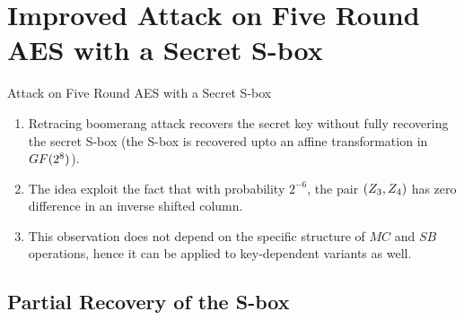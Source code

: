\documentclass[notheorems]{beamer}
\theoremstyle{definition}
\theoremstyle{example}
\begin{document}
    \section[Secret S-Boxes]{Improved Attack on Five Round AES with a Secret S-box}
    \label{sec:secret-s-box}

    \begin{frame}[<+->]{Attack on Five Round AES with a Secret S-box}
        \begin{enumerate}
            \item Retracing boomerang attack recovers the secret key without
            fully recovering the secret S-box (the S-box is recovered upto an
            affine transformation in \(GF(2^8)\)).
            \item The idea exploit the fact that with probability \(2^{-6}\),
            the pair \((Z_3, Z_4)\) has zero difference in an inverse
            shifted column.
            \item This observation does not depend on the specific structure of
            \(MC\) and \(SB\) operations, hence it can be applied to
            key-dependent variants as well.
        \end{enumerate}
    \end{frame}

    \subsection{Partial Recovery of the S-box}
    \label{subsec:s-box-recovery}
\end{document}
